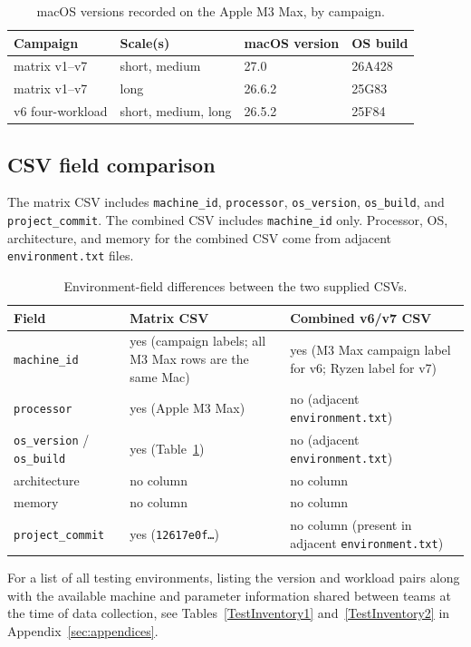 \begin{table}[H]
\centering
\caption{macOS versions recorded on the Apple M3 Max, by campaign.}
\label{tab:macos-campaigns}
\footnotesize
\setlength{\tabcolsep}{8pt}
\begin{tabular}{@{}llll@{}}
\toprule
Campaign & Scale(s) & macOS version & OS build \\
\midrule
matrix v1--v7 & short, medium & 27.0   & 26A428 \\
matrix v1--v7 & long          & 26.6.2 & 25G83  \\
v6 four-workload & short, medium, long & 26.5.2 & 25F84 \\
\bottomrule
\end{tabular}
\end{table}

\subsection{CSV field comparison}

The matrix CSV
includes \texttt{machine\_id}, \texttt{processor}, \texttt{os\_version}, \texttt{os\_build}, and \texttt{project\_commit}.
The combined CSV
includes \texttt{machine\_id} only.
Processor, OS, architecture, and memory for the combined CSV come from adjacent \texttt{environment.txt} files.

\begin{table}[H]
\centering
\caption{Environment-field differences between the two supplied CSVs.}
\label{tab:csv-field-diff}
\footnotesize
\begin{tabularx}{\textwidth}{@{}l L L@{}}
\toprule
Field & Matrix CSV & Combined v6/v7 CSV \\
\midrule
\texttt{machine\_id} & yes (campaign labels; all M3 Max rows are the same Mac) & yes (M3 Max campaign label for v6; Ryzen label for v7) \\
\texttt{processor} & yes (Apple M3 Max) & no (adjacent \texttt{environment.txt}) \\
\texttt{os\_version} / \texttt{os\_build} & yes (Table~\ref{tab:macos-campaigns}) & no (adjacent \texttt{environment.txt}) \\
architecture & no column & no column \\
memory & no column & no column \\
\texttt{project\_commit} & yes (\texttt{12617e0f\ldots}) & no column (present in adjacent \texttt{environment.txt}) \\
\bottomrule
\end{tabularx}
\end{table}

For a list of all testing environments, listing the version and workload pairs along with the available machine and parameter information shared between teams at the time of data collection, see Tables~\ref{TestInventory1} and~\ref{TestInventory2} in Appendix~\ref{sec:appendices}.
